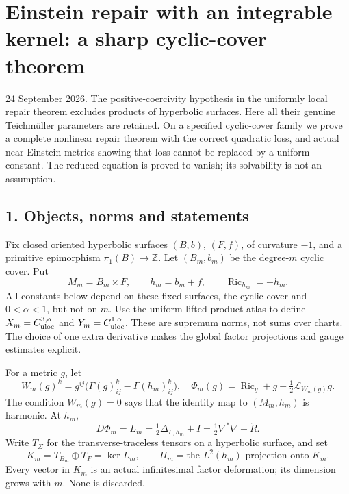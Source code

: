 \documentclass[
  11pt,
]{article}
\author{}
\date{}
\begin{document}
\hypertarget{einstein-repair-with-an-integrable-kernel-a-sharp-cyclic-cover-theorem}{%
\section{Einstein repair with an integrable kernel: a sharp cyclic-cover
theorem}\label{einstein-repair-with-an-integrable-kernel-a-sharp-cyclic-cover-theorem}}

24 September 2026. The positive-coercivity hypothesis in the
\href{20260924_uniformly_local_repair.md}{uniformly local repair
theorem} excludes products of hyperbolic surfaces. Here all their
genuine Teichmüller parameters are retained. On a specified cyclic-cover
family we prove a complete nonlinear repair theorem with the correct
quadratic loss, and actual near-Einstein metrics showing that loss
cannot be replaced by a uniform constant. The reduced equation is proved
to vanish; its solvability is not an assumption.

\hypertarget{objects-norms-and-statements}{%
\subsection{1. Objects, norms and
statements}\label{objects-norms-and-statements}}

Fix closed oriented hyperbolic surfaces \((B,b)\), \((F,f)\), of
curvature \(-1\), and a primitive epimorphism \(\pi_1(B)\to\mathbb Z\).
Let \((B_m,b_m)\) be the degree-\(m\) cyclic cover. Put \[
 M_m=B_m\times F,\qquad h_m=b_m+f,\qquad
 \operatorname{Ric}_{h_m}=-h_m.
\] All constants below depend on these fixed surfaces, the cyclic cover
and \(0<\alpha<1\), but not on \(m\). Use the uniform lifted product
atlas to define \(X_m=C^{3,\alpha}_{\rm uloc}\) and
\(Y_m=C^{1,\alpha}_{\rm uloc}\). These are supremum norms, not sums over
charts. The choice of one extra derivative makes the global factor
projections and gauge estimates explicit.

For a metric \(g\), let \[
 W_m(g)^k=g^{ij}\bigl(\Gamma(g)^k_{ij}-\Gamma(h_m)^k_{ij}\bigr),
 \quad
 \Phi_m(g)=\operatorname{Ric}_g+g-\tfrac12\mathcal L_{W_m(g)}g.
                                                               \tag{1}
\] The condition \(W_m(g)=0\) says that the identity map to
\((M_m,h_m)\) is harmonic. At \(h_m\), \[
 D\Phi_m=L_m=\tfrac12\Delta_{L,h_m}+I
            =\tfrac12\nabla^*\nabla-\mathring R.
\] Write \(T_\Sigma\) for the transverse-traceless tensors on a
hyperbolic surface, and set \[
 K_m=T_{B_m}\oplus T_F=\ker L_m,
 \qquad \Pi_m=\text{the }L^2(h_m)\text{-projection onto }K_m.
                                                               \tag{2}
\] Every vector in \(K_m\) is an actual infinitesimal factor
deformation; its dimension grows with \(m\). None is discarded.
\end{document}
